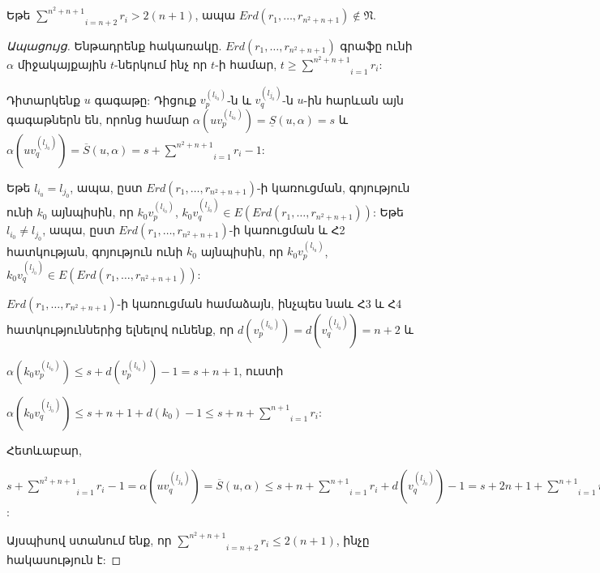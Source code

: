 \begin{theorem}
\label{t3_Erdos} Եթե $\underset{i=n+2}{\overset{n^{2}+n+1}{\sum
}}r_{i}> 2(n+1)$, ապա $Erd(r_{1},\ldots,r_{n^{2}+n+1})\notin
\mathfrak{N}$.
\end{theorem}
\begin{proof}[Ապացույց]
Ենթադրենք հակառակը.
$Erd(r_{1},\ldots,r_{n^{2}+n+1})$ գրաֆը ունի $\alpha$ միջակայքային $t$-ներկում
ինչ որ $t$-ի համար, $t\geq \underset{i=1}{\overset{n^{2}+n+1}{\sum
}}r_{i}$:

Դիտարկենք $u$ գագաթը: Դիցուք $v_{p}^{(l_{i_{0}})}$-ն և
$v_{q}^{(l_{j_{0}})}$-ն $u$-ին հարևան այն գագաթներն են, որոնց համար 
$\alpha\left(uv_{p}^{(l_{i_{0}})}\right)=\underline{S}(u,\alpha)=s$ և
$\alpha\left(uv_{q}^{(l_{j_{0}})}\right)=\overline{S}(u,\alpha)=s+\underset{i=1}{\overset{n^{2}+n+1}{\sum
}}r_{i}-1$:

Եթե $l_{i_{0}}=l_{j_{0}}$, ապա, ըստ 
$Erd(r_{1},\ldots,r_{n^{2}+n+1})$-ի կառուցման, գոյություն ունի $k_{0}$ այնպիսին, որ
$k_{0}v_{p}^{(l_{i_{0}})}$, $k_{0}v_{q}^{(l_{j_{0}})}\in
E(Erd(r_{1},\ldots,r_{n^{2}+n+1}))$: Եթե $l_{i_{0}}\neq l_{j_{0}}$,
ապա, ըստ $Erd(r_{1},\ldots,r_{n^{2}+n+1})$-ի կառուցման և
Հ2 հատկության, գոյություն ունի $k_{0}$ այնպիսին, որ
$k_{0}v_{p}^{(l_{i_{0}})}$, $k_{0}v_{q}^{(l_{j_{0}})}\in
E(Erd(r_{1},\ldots,r_{n^{2}+n+1}))$:

$Erd(r_{1},\ldots,r_{n^{2}+n+1})$-ի կառուցման համաձայն, ինչպես նաև Հ3 և Հ4 հատկություններից ելնելով ունենք, որ
$d\left(v_{p}^{(l_{i_{0}})}\right)=d\left(v_{q}^{(l_{j_{0}})}\right)=n+2$
և
\begin{center}
$\alpha\left(k_{0}v_{p}^{(l_{i_{0}})}\right)\leq
s+d\left(v_{p}^{(l_{i_{0}})}\right)-1=s+n+1$, ուստի
\end{center}
\begin{center}
$\alpha\left(k_{0}v_{q}^{(l_{j_{0}})}\right)\leq
s+n+1+d(k_{0})-1\leq s+n+\underset{i=1}{\overset{n+1}{\sum }}r_{i}$:
\end{center}

Հետևաբար,
\begin{center}
$s+\underset{i=1}{\overset{n^{2}+n+1}{\sum
}}r_{i}-1=\alpha\left(uv_{q}^{(l_{j_{0}})}\right)=\overline{S}(u,\alpha)\leq
s+n+\underset{i=1}{\overset{n+1}{\sum
}}r_{i}+d\left(v_{q}^{(l_{j_{0}})}\right)-1=s+2n+1+\underset{i=1}{\overset{n+1}{\sum
}}r_{i}$:
\end{center}

Այսպիսով ստանում ենք, որ $\underset{i=n+2}{\overset{n^{2}+n+1}{\sum }}r_{i}\leq
2(n+1)$, ինչը հակասություն է:
\end{proof}

